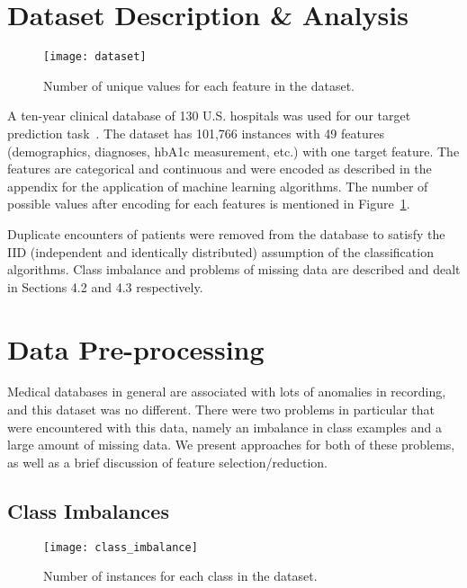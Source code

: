 \documentclass[conference]{IEEEtran}
\begin{document}
\section{Dataset Description \& Analysis}


\begin{figure}[htpb]
	\centering
	\texttt{[image: dataset]}
	\caption{Number of unique values for each feature in the dataset.}
	\label{fig:dataset}
\end{figure}

A ten-year clinical database of 130 U.S. hospitals was used for our target prediction task~\cite{dataset-2014, hba1c-2014}. The dataset has 101,766 instances with 49 features (demographics, diagnoses, hbA1c measurement, etc.) with one target feature. The features are categorical and continuous and were encoded as described in the appendix for the application of machine learning algorithms. The number of possible values after encoding for each features is mentioned in Figure~\ref{fig:dataset}.

Duplicate encounters of patients were removed from the database to satisfy the IID (independent and identically distributed) assumption of the classification algorithms. Class imbalance and problems of missing data are described and dealt in Sections 4.2 and 4.3 respectively.

\section{Data Pre-processing}


Medical databases in general are associated with lots of anomalies in recording, and this dataset was no different. There were two problems in particular that were encountered with this data, namely an imbalance in class examples and a large amount of missing data. We present approaches for both of these problems, as well as a brief discussion of feature selection/reduction.

\subsection{Class Imbalances}

\begin{figure}[htpb]
	\centering
	\texttt{[image: class\_imbalance]}
	\caption{Number of instances for each class in the dataset.}
	\label{fig:class_imbalance}
\end{figure}
\end{document}
